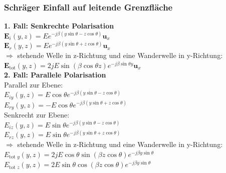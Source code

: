 \documentclass[english]{latex4ei/latex4ei_sheet}
\begin{document}
\begin{sectionbox}
    \subsubsection{Schräger Einfall auf leitende Grenzfläche}
    \textbf{1. Fall: Senkrechte Polarisation}\\
    $\mathbf{E}_i(y,z) = Ee^{-j\beta (y\sin{\theta} - z\cos{\theta} )}\mathbf{u}_x$\\
    $\mathbf{E}_r(y,z) = Ee^{-j\beta (y\sin{\theta} + z\cos{\theta} )}\mathbf{u}_x$\\
    $\Rightarrow$ stehende Welle in z-Richtung und eine Wanderwelle in y-Richtung:\\
    $\mathbf{E}_{\text{tot}}(y,z) = 2jE\sin{(\beta\cos{\theta} z )}e^{-j \beta\sin{\theta} y }\mathbf{u}_x$\\
    \textbf{2. Fall: Parallele Polarisation}\\
    Parallel zur Ebene:\\
    $E_{i y}(y,z) = E \cos{\theta}e^{-j\beta(y\sin{\theta}-z\cos{\theta})}$\\
    $E_{r y}(y, z)=-E \cos \theta e^{-j \beta(y \sin \theta+z \cos \theta)}$\\
    Senkrecht zur Ebene:\\
    $E_{i z}(y, z)=E \sin \theta e^{-j \beta(y \sin \theta-z \cos \theta)}$\\
    $E_{r z}(y, z)=E \sin \theta e^{-j \beta(y \sin \theta+z \cos \theta)}$\\
    $\Rightarrow$ stehende Welle in z-Richtung und eine Wanderwelle in y-Richtung:\\
    $E_{\text {tot } y}(y, z)=2 j E \cos \theta \sin (\beta z \cos \theta) e^{-j \beta y \sin \theta}$ \\
    $E_{\text {tot } z}(y, z)=2 E \sin \theta \cos (\beta z \cos \theta) e^{-j \beta y \sin \theta}$
\end{sectionbox}
\end{document}

